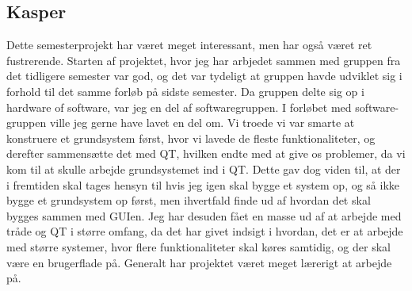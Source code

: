 \subsection{Kasper}
Dette semesterprojekt har været meget interessant, men har også været ret fustrerende. Starten af projektet, hvor jeg har arbjedet sammen med gruppen fra det tidligere semester var god, og det var tydeligt at gruppen havde udviklet sig i forhold til det samme forløb på sidste semester. Da gruppen delte sig op i hardware of software, var jeg en del af softwaregruppen. I forløbet med software-gruppen ville jeg gerne have lavet en del om. Vi troede vi var smarte at konstruere et grundsystem først, hvor vi lavede de fleste funktionaliteter, og derefter sammensætte det med QT, hvilken endte med at give os problemer, da vi kom til at skulle arbejde grundsystemet ind i QT. Dette gav dog viden til, at der i fremtiden skal tages hensyn til hvis jeg igen skal bygge et system op, og så ikke bygge et grundsystem op først, men ihvertfald finde ud af hvordan det skal bygges sammen med GUIen. Jeg har desuden fået en masse ud af at arbejde med tråde og QT i større omfang, da det har givet indsigt i hvordan, det er at arbejde med større systemer, hvor flere funktionaliteter skal køres samtidig, og der skal være en brugerflade på. Generalt har projektet været meget lærerigt at arbejde på.